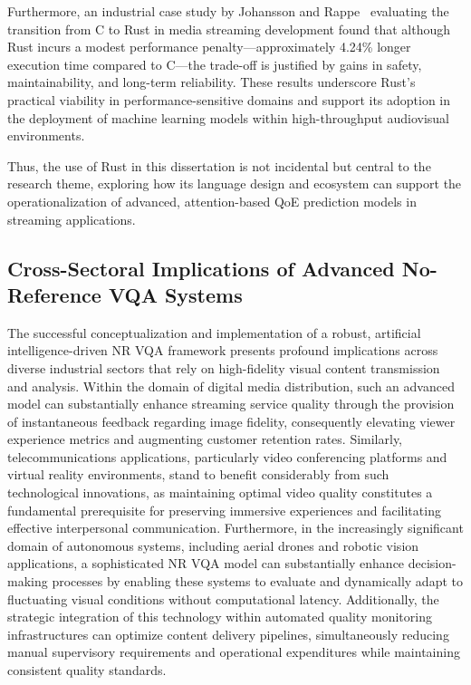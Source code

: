 Furthermore, an industrial case study by Johansson and Rappe~\cite{johansson2023transitioning} evaluating the transition from C to Rust in media streaming development found that although Rust incurs a modest performance penalty—approximately 4.24\% longer execution time compared to C—the trade-off is justified by gains in safety, maintainability, and long-term reliability. These results underscore Rust's practical viability in performance-sensitive domains and support its adoption in the deployment of machine learning models within high-throughput audiovisual environments.

Thus, the use of Rust in this dissertation is not incidental but central to the research theme, exploring how its language design and ecosystem can support the operationalization of advanced, attention-based QoE prediction models in streaming applications.

\subsection{Cross-Sectoral Implications of Advanced No-Reference VQA Systems}

The successful conceptualization and implementation of a robust, artificial intelligence-driven NR VQA framework presents profound implications across diverse industrial sectors that rely on high-fidelity visual content transmission and analysis. Within the domain of digital media distribution, such an advanced model can substantially enhance streaming service quality through the provision of instantaneous feedback regarding image fidelity, consequently elevating viewer experience metrics and augmenting customer retention rates. Similarly, telecommunications applications, particularly video conferencing platforms and virtual reality environments, stand to benefit considerably from such technological innovations, as maintaining optimal video quality constitutes a fundamental prerequisite for preserving immersive experiences and facilitating effective interpersonal communication. Furthermore, in the increasingly significant domain of autonomous systems, including aerial drones and robotic vision applications, a sophisticated NR VQA model can substantially enhance decision-making processes by enabling these systems to evaluate and dynamically adapt to fluctuating visual conditions without computational latency. Additionally, the strategic integration of this technology within automated quality monitoring infrastructures can optimize content delivery pipelines, simultaneously reducing manual supervisory requirements and operational expenditures while maintaining consistent quality standards.

